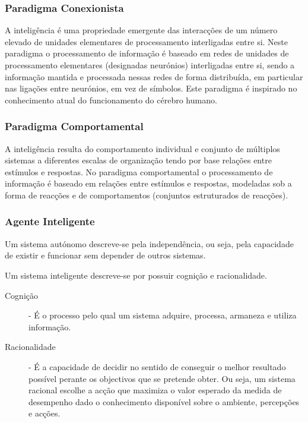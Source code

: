 \documentclass[a4paper,12pt]{article}
\begin{document}
\subsubsection{Paradigma Conexionista} \label{paradigma_conexionista}
A inteligência é uma propriedade emergente das interacções de um número elevado de unidades elementares de processamento interligadas entre si.
Neste paradigma o processamento de informação é baseado em redes de unidades de processamento elementares (designadas neurónios) interligadas entre si, sendo a informação mantida e processada nessas redes de forma distribuída, em particular nas ligações entre neurónios, em vez de símbolos. Este paradigma é inspirado no conhecimento atual do funcionamento do cérebro humano.

\subsubsection{Paradigma Comportamental} \label{paradigma_comportamental}
A inteligência resulta do comportamento individual e conjunto de múltiplos sistemas a diferentes escalas de organização tendo por base relações entre estímulos e respostas.
No paradigma comportamental o processamento de informação é baseado em relações entre estímulos e respostas, modeladas sob a forma de reacções e de comportamentos (conjuntos estruturados de reacções).

\subsubsection{Agente Inteligente} \label{agente_inteligente}
Um sistema autónomo descreve-se pela independência, ou seja, pela capacidade de existir e funcionar sem depender de outros sistemas.

Um sistema inteligente descreve-se por possuir cognição e racionalidade.

\begin{description}
	\item[Cognição] - É o processo pelo qual um sistema adquire, processa, armaneza e utiliza informação.
	\item[Racionalidade] - É a capacidade de decidir no sentido de conseguir o melhor resultado possível perante os objectivos que se pretende obter. Ou seja, um sistema racional escolhe a acção que maximiza o valor esperado da medida de desempenho dado o conhecimento disponível sobre o ambiente, percepções e acções.
\end{description}
\end{document}
